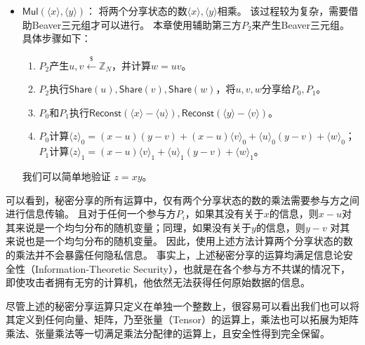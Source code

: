 \begin{itemize}
    \item $\mathsf{Mul}(\langle x \rangle, \langle y \rangle)$：
    将两个分享状态的数$\langle x \rangle, \langle y \rangle$相乘。
    该过程较为复杂，需要借助Beaver三元组才可以进行。
    本章使用辅助第三方$P_2$来产生Beaver三元组。
    具体步骤如下：
    \begin{enumerate}
        \item $P_2$产生$u, v\stackrel{\$}{\gets} \mathbb Z_N$，并计算$w = uv$。
        
        \item $P_2$执行$\mathsf{Share}(u), \mathsf{Share}(v), \mathsf{Share}(w)$，将$u, v, w$分享给$P_0, P_1$。
        
        \item $P_0$和$P_1$执行$\mathsf{Reconst}(\langle x \rangle - \langle u \rangle), \mathsf{Reconst}(\langle y \rangle - \langle v \rangle)$。

        \item $P_0$计算$\langle  z \rangle_0 = (x - u)(y - v) + (x - u)\langle v \rangle_0 + \langle u \rangle_0 (y - v) + \langle w \rangle_0$；$P_1$计算$\langle  z \rangle_1 = (x - u)\langle v \rangle_1 + \langle u \rangle_1 (y - v) + \langle w \rangle_1$。
    \end{enumerate}
    我们可以简单地验证 $z = xy$。
\end{itemize}

可以看到，秘密分享的所有运算中，仅有两个分享状态的数的乘法需要参与方之间进行信息传输。
%
且对于任何一个参与方$P_i$，如果其没有关于$x$的信息，则$x - u$对其来说是一个均匀分布的随机变量；同理，如果没有关于$y$的信息，则$y - v$ 对其来说也是一个均匀分布的随机变量。
%
因此，使用上述方法计算两个分享状态的数的乘法并不会暴露任何隐私信息。
%
事实上，上述秘密分享的运算均满足信息论安全性（Information-Theoretic Security），也就是在各个参与方不共谋的情况下，即使攻击者拥有无穷的计算机，他依然无法获得任何原始数据的信息\cite{beaver1992efficient}。

尽管上述的秘密分享运算只定义在单独一个整数上，很容易可以看出我们也可以将其定义到任何向量、矩阵，乃至张量（Tensor）的运算上，乘法也可以拓展为矩阵乘法、张量乘法等一切满足乘法分配律的运算上，且安全性得到完全保留。

